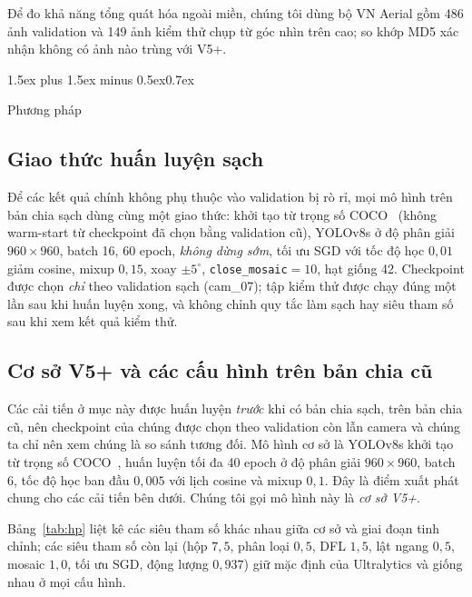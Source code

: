 \documentclass[10pt,journal,letterpaper]{IEEEtran}
\makeatletter
\renewcommand\section{\@startsection{section}{1}{\z@}%
  {1.5ex plus 1.5ex minus 0.5ex}{0.7ex}{\normalfont\scshape\raggedright}}
\makeatother
\begin{document}
Để đo khả năng tổng quát hóa ngoài miền, chúng tôi dùng bộ VN Aerial gồm 486 ảnh validation và 149 ảnh kiểm thử chụp từ góc nhìn trên cao; so khớp MD5 xác nhận không có ảnh nào trùng với V5+.

\section{Phương pháp}
\subsection{Giao thức huấn luyện sạch}
Để các kết quả chính không phụ thuộc vào validation bị rò rỉ, mọi mô hình trên bản chia sạch dùng cùng một giao thức: khởi tạo từ trọng số COCO~\cite{coco} (không warm-start từ checkpoint đã chọn bằng validation cũ), YOLOv8s ở độ phân giải $960\times960$, batch 16, 60 epoch, \emph{không dừng sớm}, tối ưu SGD với tốc độ học $0{,}01$ giảm cosine, mixup $0{,}15$, xoay $\pm5^{\circ}$, \texttt{close\_mosaic}$=10$, hạt giống 42. Checkpoint được chọn \emph{chỉ} theo validation sạch (cam\_07); tập kiểm thử được chạy đúng một lần sau khi huấn luyện xong, và không chỉnh quy tắc làm sạch hay siêu tham số sau khi xem kết quả kiểm thử.

\subsection{Cơ sở V5+ và các cấu hình trên bản chia cũ}
Các cải tiến ở mục này được huấn luyện \emph{trước} khi có bản chia sạch, trên bản chia cũ, nên checkpoint của chúng được chọn theo validation còn lẫn camera và chúng ta chỉ nên xem chúng là so sánh tương đối. Mô hình cơ sở là YOLOv8s khởi tạo từ trọng số COCO~\cite{coco}, huấn luyện tối đa 40 epoch ở độ phân giải $960\times960$, batch 6, tốc độ học ban đầu $0{,}005$ với lịch cosine và mixup $0{,}1$. Đây là điểm xuất phát chung cho các cải tiến bên dưới. Chúng tôi gọi mô hình này là \emph{cơ sở V5+}.

Bảng~\ref{tab:hp} liệt kê các siêu tham số khác nhau giữa cơ sở và giai đoạn tinh chỉnh; các siêu tham số còn lại (hộp $7{,}5$, phân loại $0{,}5$, DFL $1{,}5$, lật ngang $0{,}5$, mosaic $1{,}0$, tối ưu SGD, động lượng $0{,}937$) giữ mặc định của Ultralytics và giống nhau ở mọi cấu hình.
\end{document}
